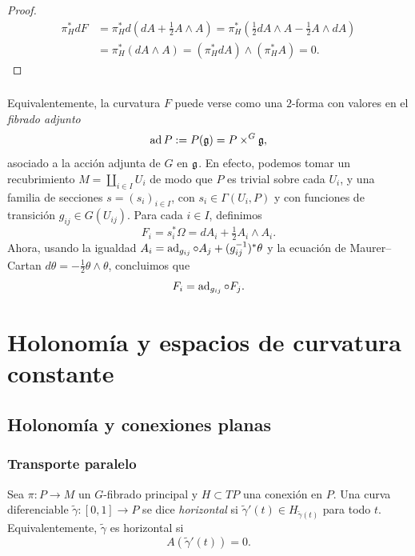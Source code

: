 \documentclass[11pt,a4paper]{amsbook}
\theoremstyle{remark} \newtheorem{rmk}[subsection]{Observación}
\theoremstyle{definition} \newtheorem{defn}[subsection]{Definición}
\theoremstyle{definition} \newtheorem{ex}[subsection]{Ejemplo}
\theoremstyle{definition} \newtheorem{ej}[subsection]{Ejercicio}
\begin{document}
\begin{proof}
\begin{align*}
  \pi_H^* dF &= \pi_H^* d(dA + \tfrac{1}{2} A \wedge A) = \pi_H^* (\tfrac{1}{2} dA \wedge A - \tfrac{1}{2} A \wedge dA) \\
  &= \pi_H^* (dA \wedge A) = (\pi_H^* dA) \wedge (\pi_H^* A) =0.
\end{align*}
\end{proof}


\subsection{} Equivalentemente, la curvatura $F$ puede verse como una $2$-forma con valores en el \emph{fibrado adjunto}
\begin{equation*}
\operatorname{ad} P := P(\mathfrak{g}) = P \times^G \mathfrak{g},
\end{equation*}
asociado a la acción adjunta de $G$ en $\mathfrak{g}$. En efecto, podemos tomar un recubrimiento $M=\coprod_{i\in I} U_i$ de modo que $P$ es trivial sobre cada $U_i$, y una familia de secciones $s=(s_i)_{i\in I}$, con $s_i \in \Gamma(U_i,P)$ y con funciones de transición $g_{ij} \in G(U_{ij})$. Para cada $i\in I$, definimos
\begin{equation*}
F_i = s_i^* \Omega = d A_i + \tfrac{1}{2} A_i \wedge A_i.
\end{equation*}
Ahora, usando la igualdad $A_i = \operatorname{ad}_{g_{ij}}\circ A_j + (g_{ij}^{-1})^* \theta$ y la ecuación de Maurer--Cartan $d\theta = -\tfrac{1}{2} \theta \wedge \theta$, concluimos que
\begin{equation*}
F_i = \operatorname{ad}_{g_{ij}} \circ F_j.
\end{equation*}

\chapter{Holonomía y espacios de curvatura constante}
\section{Holonomía y conexiones planas}
\subsection{Transporte paralelo} Sea $\pi:P\rightarrow M$ un $G$-fibrado principal y $H\subset TP$ una conexión en $P$. Una curva diferenciable $\tilde{\gamma}:[0,1]\rightarrow P$ se dice \emph{horizontal} si $\tilde{\gamma}'(t) \in H_{\tilde{\gamma}(t)}$ para todo $t$. Equivalentemente, $\tilde{\gamma}$ es horizontal si
\begin{equation*}
A(\tilde{\gamma}'(t)) = 0.
\end{equation*}
\end{document}
